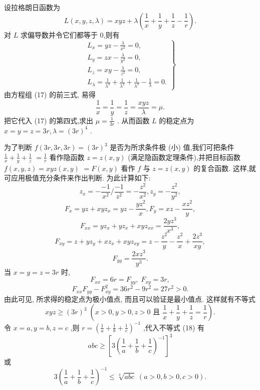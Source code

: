 \begin{solution}

\end{solution}
设拉格朗日函数为
\[
L\left( {x,y,z,\lambda }\right)  = {xyz} + \lambda \left( {\frac{1}{x} + \frac{1}{y} + \frac{1}{z} - \frac{1}{r}}\right) .
\]
对 \(L\) 求偏导数并令它们都等于 0,则有
\[
\left. \begin{array}{l} {L}_{x} = {yz} - \frac{\lambda }{{x}^{2}} = 0, \\  {L}_{y} = {zx} - \frac{\lambda }{{y}^{2}} = 0, \\  {L}_{z} = {xy} - \frac{\lambda }{{z}^{2}} = 0, \\  {L}_{\lambda } = \frac{1}{{\lambda }^{2}} + \frac{1}{{\lambda }^{2}} + \frac{1}{{\lambda }^{2}} - \frac{1}{\lambda } = 0. \end{array}\right\}   \tag{17}
\]
由方程组 (17) 的前三式, 易得
\[
\frac{1}{x} = \frac{1}{y} = \frac{1}{z} = \frac{xyz}{\lambda } = \mu .
\]
把它代入 (17) 的第四式,求出 \(\mu  = \frac{1}{3r}\) . 从而函数 \(L\) 的稳定点为 \(x = y = z = {3r},\lambda  = {\left( 3r\right) }^{4}\) .

为了判断 \(f\left( {{3r},{3r},{3r}}\right)  = {\left( 3r\right) }^{3}\) 是否为所求条件极 (小) 值,我们可把条件 \(\frac{1}{x} + \frac{1}{y} + \frac{1}{z}\)  \(= \frac{1}{r}\) 看作隐函数 \(z = z\left( {x,y}\right)\) (满足隐函数定理条件),并把目标函数 \(f\left( {x,y,z}\right)  = {xyz}\left( {x,y}\right)\)  \(= F\left( {x,y}\right)\) 看作 \(f\) 与 \(z = z\left( {x,y}\right)\) 的复合函数. 这样,就可应用极值充分条件来作出判断. 为此计算如下:
\[
{z}_{x} =  - \frac{-1}{{x}^{2}}/\frac{-1}{{z}^{2}} =  - \frac{{z}^{2}}{{x}^{2}},{z}_{y} =  - \frac{{z}^{2}}{{y}^{2}},
\]
\[
{F}_{x} = {yz} + {xy}{z}_{x} = {yz} - \frac{y{z}^{2}}{x},{F}_{y} = {xz} - \frac{x{z}^{2}}{y},
\]
\[
{F}_{xx} = y{z}_{x} + y{z}_{x} + {xy}{z}_{xx} = \frac{{2y}{z}^{3}}{{x}^{3}},
\]
\[
{F}_{xy} = z + y{z}_{y} + x{z}_{x} + {xy}{z}_{xy} = z - \frac{{z}^{2}}{y} - \frac{{z}^{2}}{x} + \frac{2{z}^{3}}{xy},
\]
\[
{F}_{yy} = \frac{{2x}{z}^{3}}{{y}^{3}}.
\]
当 \(x = y = z = {3r}\) 时,
\[
{F}_{xx} = {6r} = {F}_{yy},\;{F}_{xy} = {3r},
\]
\[
{F}_{xx}{F}_{yy} - {F}_{xy}^{2} = {36}{r}^{2} - 9{r}^{2} = {27}{r}^{2} > 0.
\]
由此可见, 所求得的稳定点为极小值点, 而且可以验证是最小值点. 这样就有不等式
\[
{xyz} \geq  {\left( 3r\right) }^{3}\;\left( {x > 0,y > 0,z > 0\text{ 且 }\frac{1}{x} + \frac{1}{y} + \frac{1}{z} = \frac{1}{r}}\right) . \tag{18}
\]
令 \(x = a,y = b,z = c\) ,则 \(r = {\left( \frac{1}{a} + \frac{1}{b} + \frac{1}{c}\right) }^{-1}\) ,代入不等式 (18) 有
\[
{abc} \geq  {\left\lbrack  3{\left( \frac{1}{a} + \frac{1}{b} + \frac{1}{c}\right) }^{-1}\right\rbrack  }^{3}
\]
或
\[
3{\left( \frac{1}{a} + \frac{1}{b} + \frac{1}{c}\right) }^{-1} \leq  \sqrt[3]{abc}\;\left( {a > 0,b > 0,c > 0}\right) .
\]
